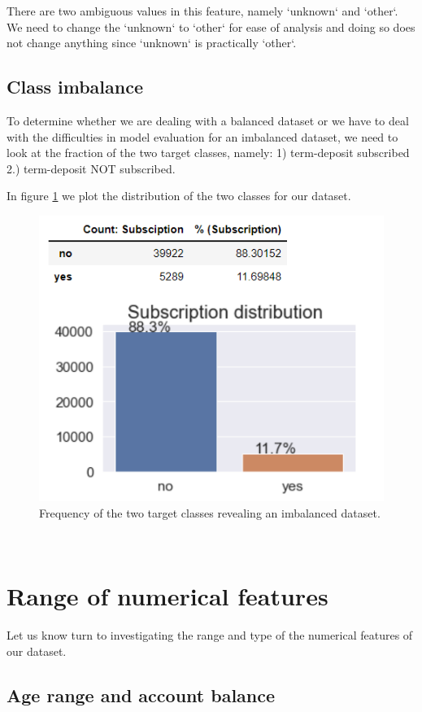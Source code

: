 There are two ambiguous values in this feature, namely `unknown` and `other`. We need to change the `unknown` to `other` for ease of analysis and doing so does not change anything since `unknown` is practically `other`.

\subsection{Class imbalance}
To determine whether we are dealing with a balanced dataset or we have to deal with the difficulties in model evaluation for an imbalanced dataset, we need to look at the fraction of the two target classes, namely: 1) term-deposit subscribed 2.) term-deposit NOT subscribed. 

In figure \ref{fig:target_imbalance} we plot the distribution of the two classes for our dataset. 

\begin{figure}[tbh]
\centering
\includegraphics[width = 0.7\hsize]{./resources/img/fig_target_imbalance.png}
\caption{Frequency of the two target classes revealing an imbalanced dataset.} 
\label{fig:target_imbalance}
\end{figure}
\\

\section{Range of numerical features}
Let us know turn to investigating the range and type of the numerical features of our dataset. 

\subsection{Age range and account balance}

